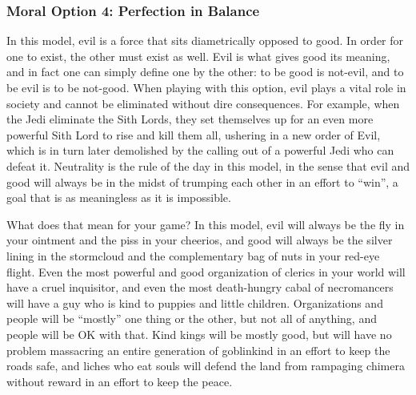 \subsubsection{Moral Option 4: Perfection in Balance}
\vspace*{-8pt}

In this model, evil is a force that sits diametrically opposed to good. In order for one to exist, the other must exist as well. Evil is what gives good its meaning, and in fact one can simply define one by the other: to be good is not-evil, and to be evil is to be not-good. When playing with this option, evil plays a vital role in society and cannot be eliminated without dire consequences. For example, when the Jedi eliminate the Sith Lords, they set themselves up for an even more powerful Sith Lord to rise and kill them all, ushering in a new order of Evil, which is in turn later demolished by the calling out of a powerful Jedi who can defeat it. Neutrality is the rule of the day in this model, in the sense that evil and good will always be in the midst of trumping each other in an effort to ``win'', a goal that is as meaningless as it is impossible.

What does that mean for your game? In this model, evil will always be the fly in your ointment and the piss in your cheerios, and good will always be the silver lining in the stormcloud and the complementary bag of nuts in your red-eye flight. Even the most powerful and good organization of clerics in your world will have a cruel inquisitor, and even the most death-hungry cabal of necromancers will have a guy who is kind to puppies and little children. Organizations and people will be ``mostly'' one thing or the other, but not all of anything, and people will be OK with that. Kind kings will be mostly good, but will have no problem massacring an entire generation of goblinkind in an effort to keep the roads safe, and liches who eat souls will defend the land from rampaging chimera without reward in an effort to keep the peace.


